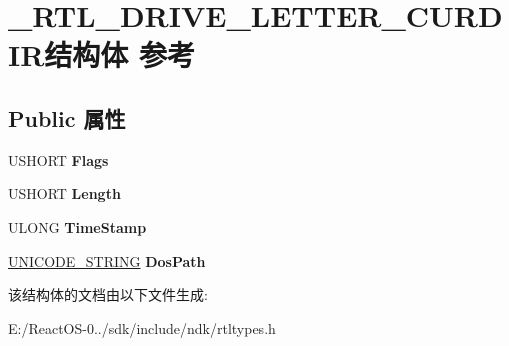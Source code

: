 \hypertarget{struct___r_t_l___d_r_i_v_e___l_e_t_t_e_r___c_u_r_d_i_r}{}\section{\+\_\+\+R\+T\+L\+\_\+\+D\+R\+I\+V\+E\+\_\+\+L\+E\+T\+T\+E\+R\+\_\+\+C\+U\+R\+D\+I\+R结构体 参考}
\label{struct___r_t_l___d_r_i_v_e___l_e_t_t_e_r___c_u_r_d_i_r}
\subsection*{Public 属性}
\begin{DoxyCompactItemize}
\item 
\mbox{\label{struct___r_t_l___d_r_i_v_e___l_e_t_t_e_r___c_u_r_d_i_r_a124deb844e8cca50b45a3853282c5880}} 
U\+S\+H\+O\+RT {\bfseries Flags}
\item 
\mbox{\label{struct___r_t_l___d_r_i_v_e___l_e_t_t_e_r___c_u_r_d_i_r_a3eae6298426133fe648fd3d2fe846d4b}} 
U\+S\+H\+O\+RT {\bfseries Length}
\item 
\mbox{\label{struct___r_t_l___d_r_i_v_e___l_e_t_t_e_r___c_u_r_d_i_r_a422769746d9f0d25e3c847913bcf33c9}} 
U\+L\+O\+NG {\bfseries Time\+Stamp}
\item 
\mbox{\label{struct___r_t_l___d_r_i_v_e___l_e_t_t_e_r___c_u_r_d_i_r_acaac6eaf4841f08b1f8f6dedf393ee46}} 
\hyperlink{struct___u_n_i_c_o_d_e___s_t_r_i_n_g}{U\+N\+I\+C\+O\+D\+E\+\_\+\+S\+T\+R\+I\+NG} {\bfseries Dos\+Path}
\end{DoxyCompactItemize}


该结构体的文档由以下文件生成\+:\begin{DoxyCompactItemize}
\item 
E\+:/\+React\+O\+S-\/0../sdk/include/ndk/rtltypes.\+h\end{DoxyCompactItemize}
